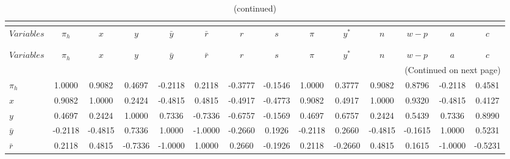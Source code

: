  
\begin{center}
\begin{longtable}{lccccccccccccc} 
\caption{MATRIX OF CORRELATIONS}\\
 \label{Table:th_corr_matrix}\\
\toprule 
$Variables  $	 & 	 $    {\pi_h}$	 & 	 $           x$	 & 	 $           y$	 & 	 $   {\bar y}$	 & 	 $   {\bar r}$	 & 	 $           r$	 & 	 $           s$	 & 	 $      {\pi}$	 & 	 $       {y^*}$	 & 	 $         {n}$	 & 	 $       {w-p}$	 & 	 $           a$	 & 	 $           c$\\
\midrule \endfirsthead 
\caption{(continued)}\\
 \toprule \\ 
$Variables  $	 & 	 $    {\pi_h}$	 & 	 $           x$	 & 	 $           y$	 & 	 $   {\bar y}$	 & 	 $   {\bar r}$	 & 	 $           r$	 & 	 $           s$	 & 	 $      {\pi}$	 & 	 $       {y^*}$	 & 	 $         {n}$	 & 	 $       {w-p}$	 & 	 $           a$	 & 	 $           c$\\
\midrule \endhead 
\midrule \multicolumn{14}{r}{(Continued on next page)} \\ \bottomrule \endfoot 
\bottomrule \endlastfoot 
${\pi_h}    $	 & 	      1.0000	 & 	      0.9082	 & 	      0.4697	 & 	     -0.2118	 & 	      0.2118	 & 	     -0.3777	 & 	     -0.1546	 & 	      1.0000	 & 	      0.3777	 & 	      0.9082	 & 	      0.8796	 & 	     -0.2118	 & 	      0.4581 \\ 
$x          $	 & 	      0.9082	 & 	      1.0000	 & 	      0.2424	 & 	     -0.4815	 & 	      0.4815	 & 	     -0.4917	 & 	     -0.4773	 & 	      0.9082	 & 	      0.4917	 & 	      1.0000	 & 	      0.9320	 & 	     -0.4815	 & 	      0.4127 \\ 
$y          $	 & 	      0.4697	 & 	      0.2424	 & 	      1.0000	 & 	      0.7336	 & 	     -0.7336	 & 	     -0.6757	 & 	     -0.1569	 & 	      0.4697	 & 	      0.6757	 & 	      0.2424	 & 	      0.5439	 & 	      0.7336	 & 	      0.8990 \\ 
${\bar y}   $	 & 	     -0.2118	 & 	     -0.4815	 & 	      0.7336	 & 	      1.0000	 & 	     -1.0000	 & 	     -0.2660	 & 	      0.1926	 & 	     -0.2118	 & 	      0.2660	 & 	     -0.4815	 & 	     -0.1615	 & 	      1.0000	 & 	      0.5231 \\ 
${\bar r}   $	 & 	      0.2118	 & 	      0.4815	 & 	     -0.7336	 & 	     -1.0000	 & 	      1.0000	 & 	      0.2660	 & 	     -0.1926	 & 	      0.2118	 & 	     -0.2660	 & 	      0.4815	 & 	      0.1615	 & 	     -1.0000	 & 	     -0.5231 \\ 

\end{longtable}
\end{center}
